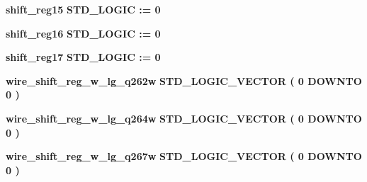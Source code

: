 \begin{DoxyCompactItemize}
\item 
{\bf shift\+\_\+reg15} {\bfseries \textcolor{comment}{S\+T\+D\+\_\+\+L\+O\+G\+IC}\textcolor{vhdlchar}{ }\textcolor{vhdlchar}{ }\textcolor{vhdlchar}{\+:}\textcolor{vhdlchar}{=}\textcolor{vhdlchar}{ }\textcolor{vhdlchar}{ }\textcolor{vhdlchar}{\textquotesingle{}}\textcolor{vhdlchar}{ } \textcolor{vhdldigit}{0} \textcolor{vhdlchar}{ }\textcolor{vhdlchar}{\textquotesingle{}}\textcolor{vhdlchar}{ }} 
\item 
{\bf shift\+\_\+reg16} {\bfseries \textcolor{comment}{S\+T\+D\+\_\+\+L\+O\+G\+IC}\textcolor{vhdlchar}{ }\textcolor{vhdlchar}{ }\textcolor{vhdlchar}{\+:}\textcolor{vhdlchar}{=}\textcolor{vhdlchar}{ }\textcolor{vhdlchar}{ }\textcolor{vhdlchar}{\textquotesingle{}}\textcolor{vhdlchar}{ } \textcolor{vhdldigit}{0} \textcolor{vhdlchar}{ }\textcolor{vhdlchar}{\textquotesingle{}}\textcolor{vhdlchar}{ }} 
\item 
{\bf shift\+\_\+reg17} {\bfseries \textcolor{comment}{S\+T\+D\+\_\+\+L\+O\+G\+IC}\textcolor{vhdlchar}{ }\textcolor{vhdlchar}{ }\textcolor{vhdlchar}{\+:}\textcolor{vhdlchar}{=}\textcolor{vhdlchar}{ }\textcolor{vhdlchar}{ }\textcolor{vhdlchar}{\textquotesingle{}}\textcolor{vhdlchar}{ } \textcolor{vhdldigit}{0} \textcolor{vhdlchar}{ }\textcolor{vhdlchar}{\textquotesingle{}}\textcolor{vhdlchar}{ }} 
\item 
{\bf wire\+\_\+shift\+\_\+reg\+\_\+w\+\_\+lg\+\_\+q262w} {\bfseries \textcolor{comment}{S\+T\+D\+\_\+\+L\+O\+G\+I\+C\+\_\+\+V\+E\+C\+T\+OR}\textcolor{vhdlchar}{ }\textcolor{vhdlchar}{(}\textcolor{vhdlchar}{ }\textcolor{vhdlchar}{ } \textcolor{vhdldigit}{0} \textcolor{vhdlchar}{ }\textcolor{keywordflow}{D\+O\+W\+N\+TO}\textcolor{vhdlchar}{ }\textcolor{vhdlchar}{ } \textcolor{vhdldigit}{0} \textcolor{vhdlchar}{ }\textcolor{vhdlchar}{)}\textcolor{vhdlchar}{ }} 
\item 
{\bf wire\+\_\+shift\+\_\+reg\+\_\+w\+\_\+lg\+\_\+q264w} {\bfseries \textcolor{comment}{S\+T\+D\+\_\+\+L\+O\+G\+I\+C\+\_\+\+V\+E\+C\+T\+OR}\textcolor{vhdlchar}{ }\textcolor{vhdlchar}{(}\textcolor{vhdlchar}{ }\textcolor{vhdlchar}{ } \textcolor{vhdldigit}{0} \textcolor{vhdlchar}{ }\textcolor{keywordflow}{D\+O\+W\+N\+TO}\textcolor{vhdlchar}{ }\textcolor{vhdlchar}{ } \textcolor{vhdldigit}{0} \textcolor{vhdlchar}{ }\textcolor{vhdlchar}{)}\textcolor{vhdlchar}{ }} 
\item 
{\bf wire\+\_\+shift\+\_\+reg\+\_\+w\+\_\+lg\+\_\+q267w} {\bfseries \textcolor{comment}{S\+T\+D\+\_\+\+L\+O\+G\+I\+C\+\_\+\+V\+E\+C\+T\+OR}\textcolor{vhdlchar}{ }\textcolor{vhdlchar}{(}\textcolor{vhdlchar}{ }\textcolor{vhdlchar}{ } \textcolor{vhdldigit}{0} \textcolor{vhdlchar}{ }\textcolor{keywordflow}{D\+O\+W\+N\+TO}\textcolor{vhdlchar}{ }\textcolor{vhdlchar}{ } \textcolor{vhdldigit}{0} \textcolor{vhdlchar}{ }\textcolor{vhdlchar}{)}\textcolor{vhdlchar}{ }} 

\end{DoxyCompactItemize}

